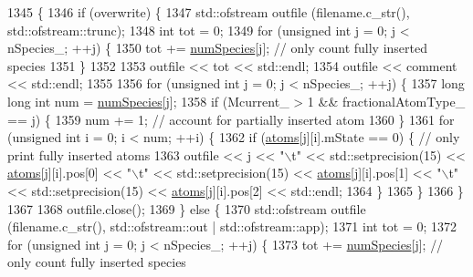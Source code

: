 \begin{DoxyCode}
1345                                                                                     \{
1346     \textcolor{keywordflow}{if} (overwrite) \{
1347         std::ofstream outfile (filename.c\_str(), std::ofstream::trunc);
1348         \textcolor{keywordtype}{int} tot = 0;
1349         \textcolor{keywordflow}{for} (\textcolor{keywordtype}{unsigned} \textcolor{keywordtype}{int} j = 0; j < nSpecies\_; ++j) \{
1350             tot += \hyperlink{classsim_system_a9eea865e6dc1cff377b1e79c4d9c23f0}{numSpecies}[j]; \textcolor{comment}{// only count fully inserted species}
1351         \}
1352 
1353         outfile << tot << std::endl;
1354         outfile << comment << std::endl;
1355 
1356         \textcolor{keywordflow}{for} (\textcolor{keywordtype}{unsigned} \textcolor{keywordtype}{int} j = 0; j < nSpecies\_; ++j) \{
1357             \textcolor{keywordtype}{long} \textcolor{keywordtype}{long} \textcolor{keywordtype}{int} num = \hyperlink{classsim_system_a9eea865e6dc1cff377b1e79c4d9c23f0}{numSpecies}[j];
1358             \textcolor{keywordflow}{if} (Mcurrent\_ > 1 && fractionalAtomType\_ == j) \{
1359                 num += 1; \textcolor{comment}{// account for partially inserted atom}
1360             \}
1361             \textcolor{keywordflow}{for} (\textcolor{keywordtype}{unsigned} \textcolor{keywordtype}{int} i = 0; i < num; ++i) \{
1362                 \textcolor{keywordflow}{if} (\hyperlink{classsim_system_a90421b19082f7fb8fc23b7264b1161e4}{atoms}[j][i].mState == 0) \{ \textcolor{comment}{// only print fully inserted atoms}
1363                     outfile << j << \textcolor{stringliteral}{"\(\backslash\)t"} <<  std::setprecision(15) << \hyperlink{classsim_system_a90421b19082f7fb8fc23b7264b1161e4}{atoms}[j][i].pos[0] << \textcolor{stringliteral}{"\(\backslash\)t"} << 
      std::setprecision(15) << \hyperlink{classsim_system_a90421b19082f7fb8fc23b7264b1161e4}{atoms}[j][i].pos[1] << \textcolor{stringliteral}{"\(\backslash\)t"} << std::setprecision(15) << 
      \hyperlink{classsim_system_a90421b19082f7fb8fc23b7264b1161e4}{atoms}[j][i].pos[2] << std::endl;
1364                 \}
1365             \}
1366         \}
1367 
1368         outfile.close();
1369     \} \textcolor{keywordflow}{else} \{
1370         std::ofstream outfile (filename.c\_str(), std::ofstream::out | std::ofstream::app);
1371         \textcolor{keywordtype}{int} tot = 0;
1372         \textcolor{keywordflow}{for} (\textcolor{keywordtype}{unsigned} \textcolor{keywordtype}{int} j = 0; j < nSpecies\_; ++j) \{
1373             tot += \hyperlink{classsim_system_a9eea865e6dc1cff377b1e79c4d9c23f0}{numSpecies}[j]; \textcolor{comment}{// only count fully inserted species}

\end{DoxyCode}
